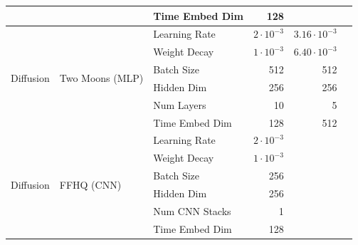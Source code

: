 \documentclass{article}
\begin{document}
\begin{table}[H]
\begin{tabular}{lllrrr}
		                               &                                  & Time Embed Dim          & 128                &                     \\
		\midrule
		\multirow{6}{*}{Diffusion}     & \multirow{6}{*}{Two Moons (MLP)}
		                               & Learning Rate                    & $2\cdot10^{-3}$         & $3.16\cdot10^{-3}$                       \\
		                               &                                  & Weight Decay            & $1\cdot10^{-3}$    & $6.40\cdot10^{-3}$  \\
		                               &                                  & Batch Size              & 512                & 512                 \\
		                               &                                  & Hidden Dim              & 256                & 256                 \\
		                               &                                  & Num Layers              & 10                 & 5                   \\
		                               &                                  & Time Embed Dim          & 128                & 512                 \\
		\midrule
		\multirow{6}{*}{Diffusion}     & \multirow{6}{*}{FFHQ (CNN)}
		                               & Learning Rate                    & $2\cdot10^{-3}$         &                                          \\
		                               &                                  & Weight Decay            & $1\cdot10^{-3}$    &                     \\
		                               &                                  & Batch Size              & 256                &                     \\
		                               &                                  & Hidden Dim              & 256                &                     \\
		                               &                                  & Num CNN Stacks          & 1                  &                     \\
		                               &                                  & Time Embed Dim          & 128                &                     \\
		\bottomrule
	\end{tabular}
\end{table}
\end{document}
